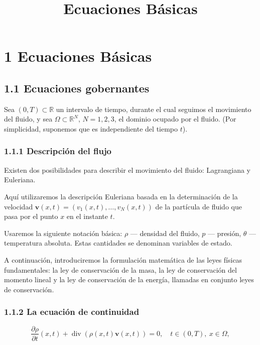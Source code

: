 \documentclass[12pt]{article}
\title{Ecuaciones Básicas}
\date{}
\begin{document}
\maketitle

\section*{1 Ecuaciones Básicas}

\subsection*{1.1 Ecuaciones gobernantes}

Sea $(0,T) \subset \mathbb{R}$ un intervalo de tiempo, durante el cual seguimos el movimiento del fluido, y sea $\Omega \subset \mathbb{R}^N$, $N=1,2,3$, el dominio ocupado por el fluido. (Por simplicidad, suponemos que es independiente del tiempo $t$).

\subsubsection*{1.1.1 Descripción del flujo}

Existen dos posibilidades para describir el movimiento del fluido: Lagrangiana y Euleriana.

Aquí utilizaremos la descripción Euleriana basada en la determinación de la velocidad $\bm{v}(x,t) = (v_1(x,t),\dots,v_N(x,t))$ de la partícula de fluido que pasa por el punto $x$ en el instante $t$.

Usaremos la siguiente notación básica: $\rho$ — densidad del fluido, $p$ — presión, $\theta$ — temperatura absoluta. Estas cantidades se denominan variables de estado.

A continuación, introduciremos la formulación matemática de las leyes físicas fundamentales: la ley de conservación de la masa, la ley de conservación del momento lineal y la ley de conservación de la energía, llamadas en conjunto leyes de conservación.

\subsubsection*{1.1.2 La ecuación de continuidad}

\begin{equation}
\frac{\partial \rho}{\partial t}(x,t) + \operatorname{div}(\rho(x,t)\bm{v}(x,t)) = 0, \quad t \in (0,T), \ x \in \Omega,
\tag{1.1.1}
\end{equation}
\end{document}
